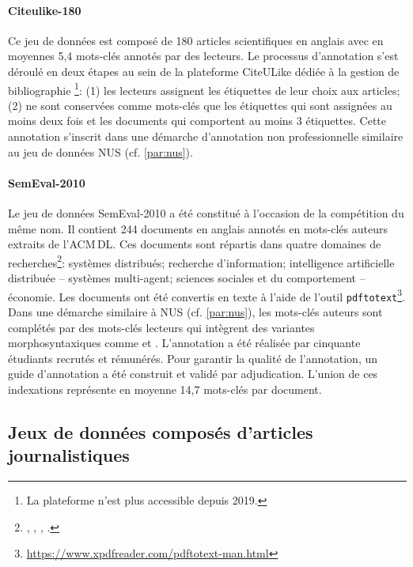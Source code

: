 \paragraph{Citeulike-180~\cite{medelyan_human-competitive_2009}}
Ce jeu de données est composé de 180 articles scientifiques en anglais avec en moyennes 5,4 mots-clés annotés par des lecteurs.
Le processus d'annotation s'est déroulé en deux étapes au sein de la plateforme CiteULike dédiée à la gestion de bibliographie \footnote{La plateforme n'est plus accessible depuis 2019.}: (1) les lecteurs assignent les étiquettes de leur choix aux articles; (2) ne sont conservées comme mots-clés que les étiquettes qui sont assignées au moins deux fois et les documents qui comportent au moins 3 étiquettes.
Cette annotation s'inscrit dans une démarche d'annotation non professionnelle similaire au jeu de données NUS (cf. \ref{par:nus}).


\paragraph{SemEval-2010~\cite{kim_semeval-2010_2010}}
Le jeu de données SemEval-2010 a été constitué à l'occasion de la compétition du même nom.
Il contient 244 documents en anglais annotés en mots-clés auteurs extraits de l'ACM\,DL.
Ces documents sont répartis dans quatre domaines de recherches\footnote{, , , .}: systèmes distribués; recherche d'information; intelligence artificielle distribuée -- systèmes multi-agent; sciences sociales et du comportement -- économie. 
Les documents ont été convertis en texte à l'aide de l'outil \texttt{pdftotext}\footnote{\url{https://www.xpdfreader.com/pdftotext-man.html}}.
Dans une démarche similaire à NUS (cf. \ref{par:nus}), les mots-clés auteurs sont complétés par des mots-clés lecteurs qui intègrent des variantes morphosyntaxiques comme  et .
L'annotation a été réalisée par cinquante étudiants recrutés et rémunérés. Pour garantir la qualité de l'annotation, un guide d'annotation a été construit et validé par adjudication.
L'union de ces indexations représente en moyenne 14,7 mots-clés par document.




\subsection{Jeux de données composés d'articles journalistiques}\label{sub:framework_news}

